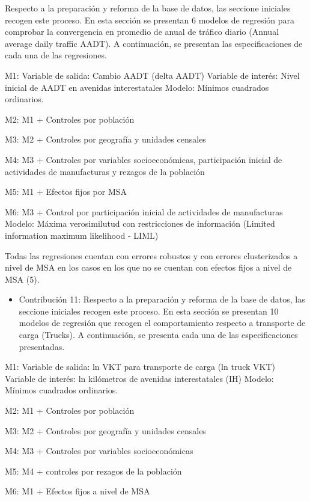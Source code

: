 \documentclass[
]{article}
\providecommand{\tightlist}{%
  \setlength{\itemsep}{0pt}\setlength{\parskip}{0pt}}
\begin{document}
Respecto a la preparación y reforma de la base de datos, las seccione
iniciales recogen este proceso. En esta sección se presentan 6 modelos
de regresión para comprobar la convergencia en promedio de anual de
tráfico diario (Annual average daily traffic AADT). A continuación, se
presentan las especificaciones de cada una de las regresiones.

M1: Variable de salida: Cambio AADT (delta AADT) Variable de interés:
Nivel inicial de AADT en avenidas interestatales Modelo: Mínimos
cuadrados ordinarios.

M2: M1 + Controles por población

M3: M2 + Controles por geografía y unidades censales

M4: M3 + Controles por variables socioeconómicas, participación inicial
de actividades de manufacturas y rezagos de la población

M5: M1 + Efectos fijos por MSA

M6: M3 + Control por participación inicial de actividades de
manufacturas Modelo: Máxima verosimilutud con restricciones de
información (Limited information maximum likelihood - LIML)

Todas las regresiones cuentan con errores robustos y con errores
clusterizados a nivel de MSA en los casos en los que no se cuentan con
efectos fijos a nivel de MSA (5).

\begin{itemize}
\tightlist
\item
  Contribución 11: Respecto a la preparación y reforma de la base de
  datos, las seccione iniciales recogen este proceso. En esta sección se
  presentan 10 modelos de regresión que recogen el comportamiento
  respecto a transporte de carga (Trucks). A continuación, se presenta
  cada una de las especificaciones presentadas.
\end{itemize}

M1: Variable de salida: ln VKT para transporte de carga (ln truck VKT)
Variable de interés: ln kilómetros de avenidas interestatales (IH)
Modelo: Mínimos cuadrados ordinarios.

M2: M1 + Controles por población

M3: M2 + Controles por geografía y unidades censales

M4: M3 + Controles por variables socioeconómicas

M5: M4 + controles por rezagos de la población

M6: M1 + Efectos fijos a nivel de MSA
\end{document}
